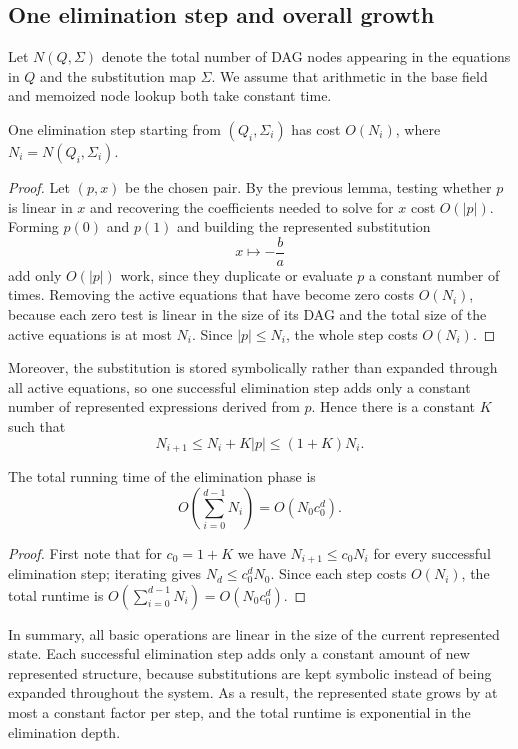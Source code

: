 \subsection*{One elimination step and overall growth}

Let $N(Q,\Sigma)$ denote the total number of DAG nodes appearing in the equations in $Q$ and the substitution map $\Sigma$.
We assume that arithmetic in the base field and memoized node lookup both take constant time.

\begin{lemma}
  One elimination step starting from $(Q_i,\Sigma_i)$ has cost $O(N_i)$, where $N_i = N(Q_i,\Sigma_i)$.
\end{lemma}

\begin{proof}
  Let $(p,x)$ be the chosen pair. By the previous lemma, testing whether $p$ is linear in $x$ and recovering the coefficients needed to solve for $x$ cost $O(|p|)$. Forming $p(0)$ and $p(1)$ and building the represented substitution
  \[
    x \mapsto -\frac{b}{a}
  \]
  add only $O(|p|)$ work, since they duplicate or evaluate $p$ a constant number of times. Removing the active equations that have become zero costs $O(N_i)$, because each zero test is linear in the size of its DAG and the total size of the active equations is at most $N_i$. Since $|p| \leq N_i$, the whole step costs $O(N_i)$.
\end{proof}

Moreover, the substitution is stored symbolically rather than expanded through all active equations, so one successful elimination step adds only a constant number of represented expressions derived from $p$. Hence there is a constant $K$ such that
\[
  N_{i+1} \leq N_i + K|p| \leq (1+K)N_i.
\]

\begin{theorem}
  The total running time of the elimination phase is
  \[
    O\!\left(\sum_{i=0}^{d-1} N_i\right) = O(N_0 c_0^d).
  \]
\end{theorem}
\begin{proof}
  First note that for $c_0 = 1 + K$ we have $N_{i+1} \leq c_0 N_i$ for every successful elimination step; iterating gives $N_d \leq c_0^d N_0$.
  Since each step costs $O(N_i)$, the total runtime is $O(\sum_{i=0}^{d-1} N_i) = O(N_0 c_0^d)$.
\end{proof}

In summary, all basic operations are linear in the size of the current represented state.
Each successful elimination step adds only a constant amount of new represented structure, because substitutions are kept symbolic instead of being expanded throughout the system.
As a result, the represented state grows by at most a constant factor per step, and the total runtime is exponential in the elimination depth.
